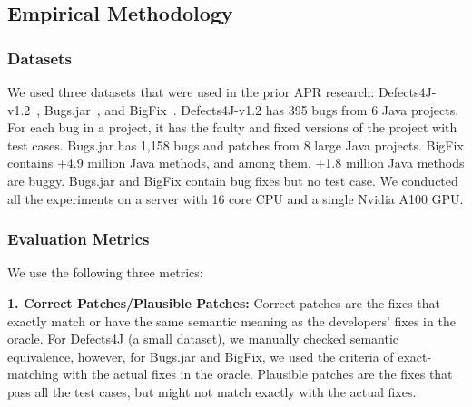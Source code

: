 \subsection{Empirical Methodology}

\subsubsection{Datasets}
We used three datasets that were used in the prior APR research:
Defects4J-v1.2~\cite{defects4j}, Bugs.jar~\cite{saha2018bugs}, and
BigFix~\cite{yioopsla19}. Defects4J-v1.2 has 395 bugs from 6 Java
projects. For each bug in a project, it has the faulty and fixed
versions of the project with test cases. Bugs.jar has 1,158 bugs and
patches from 8 large Java projects. BigFix contains +4.9 million Java
methods, and among them, +1.8 million Java methods are buggy. Bugs.jar
and BigFix contain bug fixes but no test case. We conducted all the
experiments on a server with 16 core CPU and a single Nvidia A100 GPU.


\subsubsection{Evaluation Metrics}

We use the following three metrics:


{\bf 1. Correct Patches/Plausible Patches:} Correct patches are the
fixes that exactly match or have the same semantic meaning as the
developers' fixes in the oracle. For Defects4J (a small dataset), we
manually checked semantic equivalence, however, for Bugs.jar and
BigFix, we used the criteria of exact-matching with the actual
fixes in the oracle.
%
Plausible patches are the fixes that pass all the test cases, but
might not match exactly with the actual fixes.


